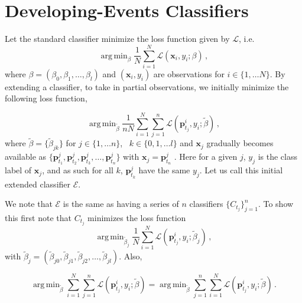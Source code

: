 \documentclass[11pt]{article}
\DeclareMathOperator*{\argmin}{arg\,min}
\begin{document}
	\section{Developing-Events Classifiers} \label{sec:ExtendedClassifier}
	 Let the standard classifier minimize the loss function given by $\mathscr{L}$, i.e. 
	$$  \argmin_\beta \frac{1}{N}\sum_{i=1}^N \mathscr{L}(\mathbf{x}_i,y_i;\beta)  \, ,  $$ 
	where $\beta = \left( \beta_0, \beta_1, \ldots, \beta_l \right)$ and $(\mathbf{x}_i, y_i)$ are observations for $i \in \{  1, \ldots N \}$. By extending a classifier, to take in partial observations, we initially minimize the following loss function,
	
	$$ \argmin_{\tilde{\beta}} \frac{1}{nN} \sum_{i=1}^N \sum_{j=1}^n \mathscr{L} \left( \mathbf{p}^i_{t_j},y_i;\tilde{\beta} \right) \, , $$
	\noindent
	where $ \tilde{\beta} = \{ \tilde{\beta}_{jk} \}$ for $ j \in \{1, \ldots n\}$,  \,  $ k \in \{0, 1, \ldots l   \} $ and $\mathbf{x}_j$ gradually becomes available as $\{\mathbf{p}^j_{t_1},\mathbf{p}^j_{t_2}, \mathbf{p}^j_{t_3}, \ldots, \mathbf{p}^j_{t_n}  \}$ with  $\mathbf{x}_j = \mathbf{p}_{t_n}^j$ . Here for a given $j$,  $y_j$ is the class label of $\mathbf{x}_j$, and as such for all $k$, $\mathbf{p}^j_{t_k}$ have the same $y_j$. Let us call this initial extended classifier $\mathscr{E}$. 
	
	We note that $\mathscr{E}$ is the same as having a series of $n$ classifiers $\{C_{t_j}\}_{j=1}^n $. To show this first note that $C_{t_j} $ minimizes the loss function
		$$ \argmin_{\tilde{\beta}_j} \frac{1}{N} \sum_{i=1}^N \mathscr{L} \left( \mathbf{p}^i_{t_j},y_i;\tilde{\beta}_j \right) \, , $$
	with $\tilde{\beta}_j = \left( \tilde{\beta}_{j0}, \tilde{\beta}_{j1}, \tilde{\beta}_{j2}, \ldots, \tilde{\beta}_{jl} \right)$. Also,
	
	\begin{equation}\label{eq:4_1}
	 \argmin_{\tilde{\beta}}  \sum_{i=1}^N \sum_{j=1}^n \mathscr{L} \left( \mathbf{p}^i_{t_j},y_i;\tilde{\beta} \right)  =    \argmin_{\tilde{\beta}} \sum_{j=1}^n \sum_{i=1}^N  \mathscr{L} \left( \mathbf{p}^i_{t_j},y_i;\tilde{\beta} \right) \, . 
	 \end{equation}
	
\end{document}
